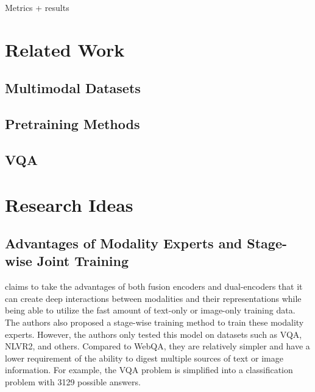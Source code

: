 \documentclass[nohyperref]{article}
\theoremstyle{plain}
\theoremstyle{definition}
\theoremstyle{remark}
\begin{document}
    Metrics + results


    \section{Related Work}

    \subsection{Multimodal Datasets}

    \subsection{Pretraining Methods}

    \subsection{VQA}


    \section{Research Ideas}

    \subsection{Advantages of Modality Experts and Stage-wise Joint Training}

    \cite{VLMO} claims to take the advantages of both fusion encoders and dual-encoders that it can create deep
    interactions between modalities and their representations while being able to utilize the fast amount of text-only
    or image-only training data.
    The authors also proposed a stage-wise training method to train these modality experts.
    However, the authors only tested this model on datasets such as VQA, NLVR2, and others.
    Compared to WebQA, they are relatively simpler and have a lower requirement of the ability to digest multiple
    sources of text or image information.
    For example, the VQA problem is simplified into a classification problem with 3129 possible answers.
\end{document}
